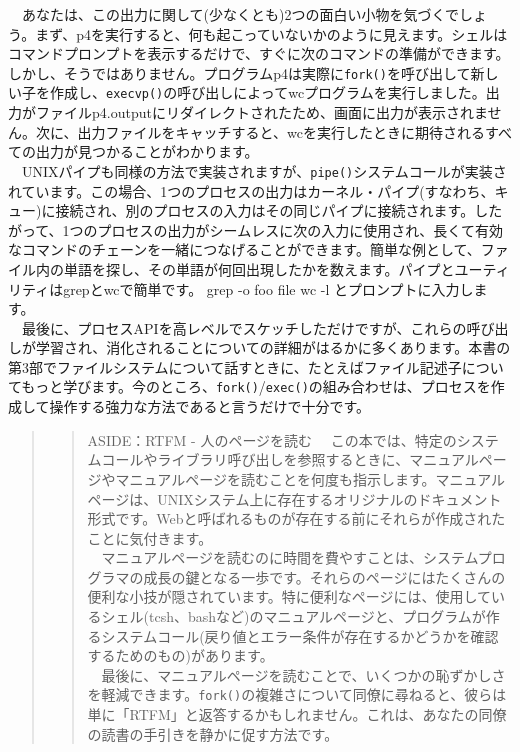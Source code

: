　あなたは、この出力に関して(少なくとも)2つの面白い小物を気づくでしょう。まず、p4を実行すると、何も起こっていないかのように見えます。シェルはコマンドプロンプトを表示するだけで、すぐに次のコマンドの準備ができます。しかし、そうではありません。プログラムp4は実際に\texttt{fork()}を呼び出して新しい子を作成し、\texttt{execvp()}の呼び出しによってwcプログラムを実行しました。出力がファイルp4.outputにリダイレクトされたため、画面に出力が表示されません。次に、出力ファイルをキャッチすると、wcを実行したときに期待されるすべての出力が見つかることがわかります。\\
　UNIXパイプも同様の方法で実装されますが、\texttt{pipe()}システムコールが実装されています。この場合、1つのプロセスの出力はカーネル・パイプ(すなわち、キュー)に接続され、別のプロセスの入力はその同じパイプに接続されます。したがって、1つのプロセスの出力がシームレスに次の入力に使用され、長くて有効なコマンドのチェーンを一緒につなげることができます。簡単な例として、ファイル内の単語を探し、その単語が何回出現したかを数えます。パイプとユーティリティはgrepとwcで簡単です。
grep -o foo file \textbar{} wc -l とプロンプトに入力します。\\
　最後に、プロセスAPIを高レベルでスケッチしただけですが、これらの呼び出しが学習され、消化されることについての詳細がはるかに多くあります。本書の第3部でファイルシステムについて話すときに、たとえばファイル記述子についてもっと学びます。今のところ、\texttt{fork()}/\texttt{exec()}の組み合わせは、プロセスを作成して操作する強力な方法であると言うだけで十分です。

\begin{quote}
\begin{quote}
ASIDE：RTFM - 人のページを読む
　この本では、特定のシステムコールやライブラリ呼び出しを参照するときに、マニュアルページやマニュアルページを読むことを何度も指示します。マニュアルページは、UNIXシステム上に存在するオリジナルのドキュメント形式です。Webと呼ばれるものが存在する前にそれらが作成されたことに気付きます。\\
　マニュアルページを読むのに時間を費やすことは、システムプログラマの成長の鍵となる一歩です。それらのページにはたくさんの便利な小技が隠されています。特に便利なページには、使用しているシェル(tcsh、bashなど)のマニュアルページと、プログラムが作るシステムコール(戻り値とエラー条件が存在するかどうかを確認するためのもの)があります。\\
　最後に、マニュアルページを読むことで、いくつかの恥ずかしさを軽減できます。\texttt{fork()}の複雑さについて同僚に尋ねると、彼らは単に「RTFM」と返答するかもしれません。これは、あなたの同僚の読書の手引きを静かに促す方法です。
\end{quote}
\end{quote}

